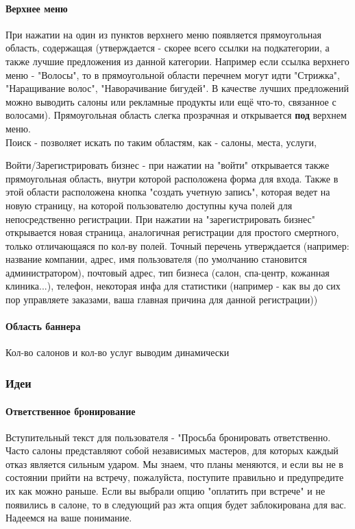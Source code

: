 \documentclass[DIV=calc, paper=a4, fontsize=11pt]{scrartcl} %
\begin{document}
\paragraph{Верхнее меню}
При нажатии на один из пунктов верхнего меню появляется прямоугольная область, содержащая (утверждается - скорее всего ссылки на подкатегории, а также лучшие предложения из данной категории. Например если ссылка верхнего меню - "Волосы", то в прямоугольной области перечнем могут идти "Стрижка", "Наращивание волос", "Наворачивание бигудей". В качестве лучших предложений можно выводить салоны или рекламные продукты или ещё что-то, связанное с волосами). Прямоугольная область слегка прозрачная и открывается \textbf{под} верхнем меню. 
\\[0.5cm]
Поиск - позволяет искать по таким областям, как - салоны, места, услуги, 

Войти/Зарегистрировать бизнес - при нажатии на "войти" открывается также прямоугольная область, внутри которой расположена форма для входа. Также в этой области расположена кнопка "создать учетную запись", которая ведет на новую страницу, на которой пользователю доступны куча полей для непосредственно регистрации.
При нажатии на "зарегистрировать бизнес" открывается новая страница, аналогичная регистрации для простого смертного, только отличающаяся по кол-ву полей. Точный перечень утверждается (например: название компании, адрес, имя пользователя (по умолчанию становится администратором), почтовый адрес, тип бизнеса (салон, спа-центр, кожанная клиника...), телефон, некоторая инфа для статистики (например - как вы до сих пор управляете заказами, ваша главная причина для данной регистрации))

\paragraph{Область баннера}
Кол-во салонов и кол-во услуг выводим динамически

\subsubsection{Идеи}

\paragraph{Ответственное бронирование}
Вступительный текст для пользователя - "Просьба бронировать ответственно. Часто салоны представляют собой независимых мастеров, для которых каждый отказ является сильным ударом. Мы знаем, что планы меняются, и если вы не в состоянии прийти на встречу, пожалуйста, поступите правильно и предупредите их как можно раньше. Если вы выбрали опцию "оплатить при встрече" и не появились в салоне, то в следующий раз жта опция будет заблокирована для вас. Надеемся на ваше понимание.
\end{document}
